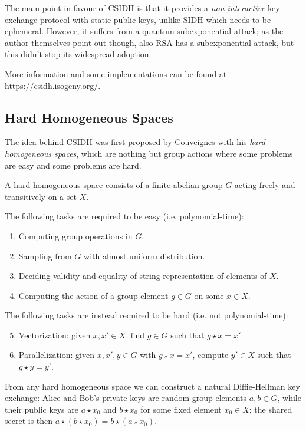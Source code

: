 The main point in favour of CSIDH is that it provides a \emph{non-interactive} key exchange protocol with static public keys, unlike SIDH which needs to be ephemeral. However, it suffers from a quantum subexponential attack; as the author themselves point out though, also RSA has a subexponential attack, but this didn't stop its widespread adoption.

More information and some implementations can be found at \url{https://csidh.isogeny.org/}.

\subsection{Hard Homogeneous Spaces}
The idea behind CSIDH was first proposed by Couveignes \cite{Couveignes} with his \emph{hard homogeneous spaces}, which are nothing but group actions where some problems are easy and some problems are hard.

\begin{definition}
    A hard homogeneous space consists of a finite abelian group $G$ acting freely and transitively on a set $X$.
    
    The following tasks are required to be easy (i.e. polynomial-time):
    \begin{enumerate}
        \item Computing group operations in $G$.
        \item Sampling from $G$ with almost uniform distribution.
        \item Deciding validity and equality of string representation of elements of $X$.
        \item Computing the action of a group element $g\in G$ on some $x\in X$.
    \end{enumerate}

    The following tasks are instead required to be hard (i.e. not polynomial-time):
    \begin{enumerate}
        \setcounter{enumi}{4}
        \item Vectorization: given $x,x'\in X$, find $g\in G$ such that $g\star x=x'$.
        \item Parallelization: given $x,x',y\in G$ with $g\star x=x'$, compute $y'\in X$ such that $g\star y=y'$.
    \end{enumerate}
\end{definition}

From any hard homogeneous space we can construct a natural Diffie-Hellman key exchange: Alice and Bob's private keys are random group elements $a,b\in G$, while their public keys are $a\star x_0$ and $b\star x_0$ for some fixed element $x_0\in X$; the shared secret is then $a\star(b\star x_0)=b\star(a\star x_0)$.

